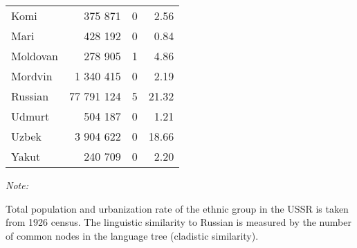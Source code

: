 \begin{table}[t]
\begin{threeparttable}
\begin{tabular}{lrrr}
Komi & 375 871 & 0 & 2.56\\
Mari & 428 192 & 0 & 0.84\\
Moldovan & 278 905 & 1 & 4.86\\
Mordvin & 1 340 415 & 0 & 2.19\\
Russian & 77 791 124 & 5 & 21.32\\
Udmurt & 504 187 & 0 & 1.21\\
Uzbek & 3 904 622 & 0 & 18.66\\
Yakut & 240 709 & 0 & 2.20\\
\bottomrule
\end{tabular}
\begin{tablenotes}
\item \textit{Note: } 
\item Total population and urbanization rate of the ethnic group in the USSR is taken from 1926 census. The linguistic similarity to Russian is measured by the number of common nodes in the language tree (cladistic similarity).
\end{tablenotes}
\end{threeparttable}
\end{table}